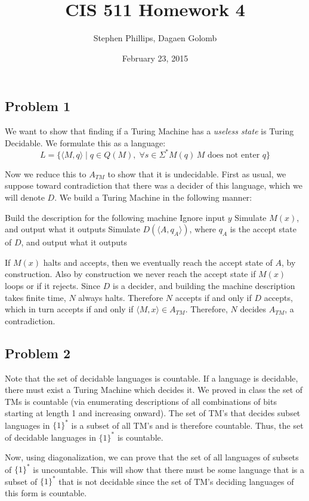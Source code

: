 \documentclass[english]{article}
\title{CIS 511 Homework 4}
\author{Stephen Phillips, Dagaen Golomb}
\date{February 23, 2015}
\begin{document}
\maketitle
\subsection*{Problem 1}
We want to show that finding if a Turing Machine has a \textit{useless state}
is Turing Decidable. We formulate this as a language:
\[ L = \{ \langle M, q \rangle \mid
   q \in Q(M), \;
   \forall s \in \Sigma^* M(q) \, M\textrm{ does not enter }q \} \]

Now we reduce this to $A_{TM}$ to show that it is undecidable. First as usual, 
we suppose toward contradiction that there was a decider of this language, which
we will denote $D$. We build a Turing Machine in the following manner:
\begin{algorithmic}
\State Build the description for the following machine
		\State Ignore input $y$
		\State Simulate $M(x)$, and output what it outputs
	\EndFunction
\State Simulate $D(\langle A, q_A \rangle)$, where $q_A$ is the accept state
		of $D$, and output what it outputs
\EndFunction 
\end{algorithmic}

If $M(x)$ halts and accepts, then we eventually reach the accept state of $A$,
by construction. Also by construction we never reach the accept state if $M(x)$
loops or if it rejects. Since $D$ is a decider, and building the machine
description takes finite time, $N$ always halts. Therefore $N$ accepts if and
only if $D$ accepts, which in turn accepts if and only if
$\langle M,x \rangle \in A_{TM}$. Therefore, $N$ decides $A_{TM}$, a
contradiction. 

\subsection*{Problem 2}
Note that the set of decidable languages is countable. If a language is decidable,
there must exist a Turing Machine which decides it. We proved in class the set of
TMs is countable (via enumerating descriptions of all combinations of bits starting
at length 1 and increasing onward). The set of TM's that decides subset languages in $\{1\}^*$
is a subset of all TM's and is therefore countable. Thus, the set of decidable languages
in $\{1\}^*$ is countable.

Now, using diagonalization, we can prove that the set of all languages of subsets of $\{1\}^*$
is uncountable. This will show that there must be some language that is a subset of $\{1\}^*$ that
is not decidable since the set of TM's deciding languages of this form is countable.
\end{document}
